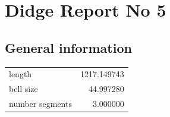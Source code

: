 \documentclass{article}
\begin{document}
\begin{centering}
\begin{figure}[!htb]
\end{figure}
\end{centering}
\section{Didge Report No 5}

\subsection{General information}
\begin{centering}

\begin{figure}[!htb]
\end{figure}
\begin{tabular}{lr}
\toprule
         length & 1217.149743 \\
      bell size &   44.997280 \\
number segments &    3.000000 \\
\bottomrule
\end{tabular}
\end{centering}
\end{document}
